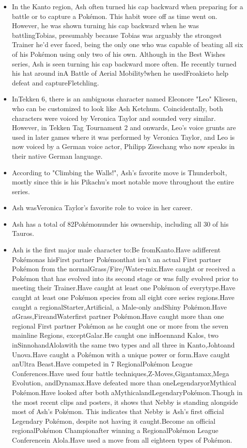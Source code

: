 \documentclass[a4paper,12pt]{article}
\begin{document}
\begin{itemize}
\item In the Kanto region, Ash often turned his cap backward when preparing for a battle or to capture a Pokémon. This habit wore off as time went on. However, he was shown turning his cap backward when he was battlingTobias, presumably because Tobias was arguably the strongest Trainer he'd ever faced, being the only one who was capable of beating all six of his Pokémon using only two of his own. Although in the Best Wishes series, Ash is seen turning his cap backward more often. He recently turned his hat around inA Battle of Aerial Mobility!when he usedFroakieto help defeat and captureFletchling.
\item InTekken 6, there is an ambiguous character named Eleonore "Leo" Kliesen, who can be customized to look like Ash Ketchum. Coincidentally, both characters were voiced by Veronica Taylor and sounded very similar. However, in Tekken Tag Tournament 2 and onwards, Leo's voice grunts are used in later games where it was performed by Veronica Taylor, and Leo is now voiced by a German voice actor, Philipp Zieschang who now speaks in their native German language.
\item According to "Climbing the Walls!", Ash's favorite move is Thunderbolt, mostly since this is his Pikachu's most notable move throughout the entire series.
\item Ash wasVeronica Taylor's favorite role to voice in her career.
\item Ash has a total of 82Pokémonunder his ownership, including all 30 of his Tauros.
\item Ash is the first major male character to:Be fromKanto.Have adifferent Pokémonas hisFirst partner Pokémonthat isn't an actual First partner Pokémon from the normalGrass/Fire/Water-mix.Have caught or received a Pokémon that has evolved into its second stage or was fully evolved prior to meeting their Trainer.Have caught at least one Pokémon of everytype.Have caught at least one Pokémon species from all eight core series regions.Have caught a regionalStarter,Artificial, a Male-only andShiny Pokémon.Have aGrass,FireandWaterfirst partner Pokémon.Have caught more than one regional First partner Pokémon as he caught one or more from the seven mainline Regions, exceptGalar.He caught one inHoennand Kalos, two inSinnohandAlolawith the same two types and all three in Kanto,Johtoand Unova.Have caught a Pokémon with a unique power or form.Have caught anUltra Beast.Have competed in 7 RegionalPokémon League Conferences.Have used four battle techniques,Z-Moves,Gigantamax,Mega Evolution, andDynamax.Have defeated more than oneLegendaryorMythical Pokémon.Have looked after both aMythicalandLegendaryPokémon.Though in the most recent clips and posters, it shows that Nebby is standing alongside most of Ash's Pokémon. This indicates that Nebby is Ash's first official Legendary Pokémon, despite not having it caught.Become an official regionalPokémon Championafter winning a RegionalPokémon League Conferencein Alola.Have used a move from all eighteen types of Pokémon.

\end{itemize}
\end{document}

